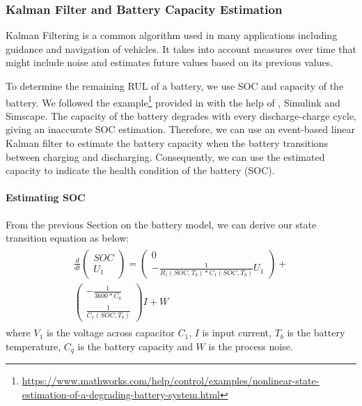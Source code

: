 \subsubsection{Kalman Filter and Battery Capacity Estimation}

Kalman Filtering is a common algorithm used in many applications including guidance and navigation of vehicles. It takes into account measures over time that might include noise and estimates future values based on its previous values.

To determine the remaining RUL of a battery, we use SOC and capacity of the battery. We followed the example\footnote{\url{https://www.mathworks.com/help/control/examples/nonlinear-state-estimation-of-a-degrading-battery-system.html}} provided in \cite{6183271} with the help of \MATLAB, Simulink and Simscape. The capacity of the battery degrades with every discharge-charge cycle, giving an inaccurate SOC estimation. Therefore, we can use an event-based linear Kalman filter to estimate the battery capacity when the battery transitions between charging and discharging. Consequently, we can use the estimated capacity to indicate the health condition of the battery (SOC).
\paragraph{Estimating SOC} From the previous Section  on the battery model, we can derive our state transition equation as below:
\begin{equation*}
  \label{state transition_1}
\begin{aligned}
\begin{split}
  \frac{d}{dt}  \left( \begin{array}{c} SOC \\ U_1 \end{array}\right) = \left( \begin{array}{c} 0 \\ - \frac{1}{R_1(SOC, T_b)*C_1(SOC, T_b)}U_1 \end{array}\right) + \\ \left( \begin{array}{c} -\frac{1}{3600*C_q} \\  \frac{1}{C_1(SOC, T_b)} \end{array}\right)I + W
 \end{split}
 \end{aligned}
\end{equation*}
where  $V_1$ is the voltage across capacitor $C_1$, $I$ is input current, $T_b$ is the battery temperature, $C_q$ is the battery capacity and $W$ is the process noise.

